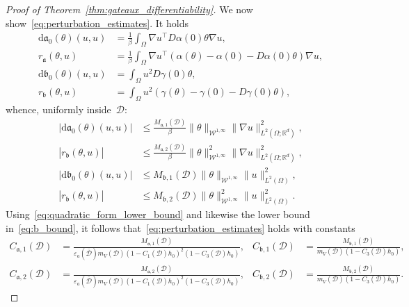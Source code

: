 \documentclass[a4]{article}
\renewcommand{\d}{\mathrm{d}}
\newcommand{\R}{\mathbb{R}}
\newcommand{\fa}{\mathfrak{a}}
\newcommand{\fb}{\mathfrak{b}}
\newcommand{\1}{\mathbbm 1}
\newcommand{\Winf}{{{\cW}^{1,\infty}}}
\newcommand{\cW}{\mathcal{W}}
\begin{document}
\begin{proof}[Proof of Theorem~\ref{thm:gateaux_differentiability}]
    We now show~\eqref{eq:perturbation_estimates}. It holds
    \begin{equation}
        \begin{aligned}
            \d \fa_0(\theta)(u,u) &= \frac1\beta\int_\Omega \nabla u^\top D\alpha(0)\theta \nabla u,\\
            r_{\fa}(\theta,u) &= \frac1\beta \int_{\Omega} \nabla u^\top\left(\alpha(\theta) - \alpha(0) - D\alpha(0)\theta\right)\nabla u,\\
            \d {\fb}_0(\theta)(u,u) &= \int_\Omega u^2 D\gamma(0)\theta,\\
            r_{\fb}(\theta,u) &= \int_\Omega u^2 \left(\gamma(\theta)-\gamma(0)-D\gamma(0)\theta\right),
        \end{aligned}
    \end{equation}
    whence, uniformly inside~$\mathcal D$:
    \begin{equation}
        \begin{aligned}
            |\d {\fa}_0(\theta)(u,u)| &\leq \frac{M_{{\fa},1}(\mathcal D)}{\beta}\|\theta\|_{\Winf}\|\nabla u\|^2_{L^2(\Omega;\R^d)},\\
            |r_{\fb}(\theta,u)| & \leq\frac{M_{{\fa},2}(\mathcal D)}{\beta}\|\theta\|^2_{\Winf}\|\nabla u\|^2_{L^2(\Omega;\R^d)},\\
            |\d {\fb}_0(\theta)(u,u)| & \leq M_{{\fb},1}(\mathcal D)\|\theta\|_{\Winf}\|u\|^2_{L^2(\Omega)},\\
            |r_{\fb}(\theta,u)|&\leq M_{{\fb},2}(\mathcal D)\|\theta\|_{\Winf}^2\|u\|^2_{L^2(\Omega)}.
        \end{aligned}
    \end{equation}
    Using~\eqref{eq:quadratic_form_lower_bound} and likewise the lower bound in~\eqref{eq:b_bound}, it follows that~\eqref{eq:perturbation_estimates} holds with constants
    \begin{equation}
        \begin{aligned}
            C_{{\fa},1}(\mathcal D) &= \frac{M_{{\fa},1}(\mathcal D)}{\varepsilon_a(\overline{\mathcal D}) m_V(\mathcal D)(1-C_1(\mathcal D)h_0)^2(1-C_3(\mathcal D)h_0)},&C_{{\fb},1}(\mathcal D) &= \frac{M_{{\fb},1}(\mathcal D)}{m_V(\mathcal D)(1-C_3(\mathcal D)h_0)},\\
            C_{{\fa},2}(\mathcal D) &= \frac{M_{{\fa},2}(\mathcal D)}{\varepsilon_a(\overline{\mathcal D}) m_V(\mathcal D)(1-C_1(\mathcal D)h_0)^2(1-C_3(\mathcal D)h_0)},&C_{{\fb},2}(\mathcal D) &= \frac{M_{{\fb},2}(\mathcal D)}{m_V(\mathcal D)(1-C_3(\mathcal D)h_0)}.
        \end{aligned}
    \end{equation}


\end{proof}
\end{document}
